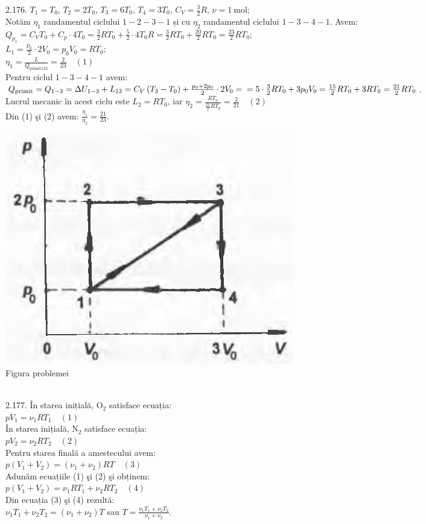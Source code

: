 2.176. $T_{1}=T_{0}$, $T_{2}=2 T_{0}$, $T_{3}=6 T_{0}$, $T_{4}=3 T_{0}$, $C_{V}=\frac{3}{2} R$, $\nu=1 \mathrm{~mol}$;\\ Notăm $\eta_{1}$ randamentul ciclului $1-2-3-1$ și cu $\eta_{2}$ randamentul ciclului $1-3-4-1$. Avem:\\ $Q_{p_{1}}=C_{V} T_{0}+C_{p} \cdot 4 T_{0}=\frac{3}{2} R T_{0}+\frac{5}{2} \cdot 4 T_{0} R=\frac{3}{2} R T_{0}+\frac{20}{2} R T_{0}=\frac{23}{2} R T_{0}$;\\ $L_{1}=\frac{p_{0}}{2} \cdot 2 V_{0}=p_{0} V_{0}=R T_{0}$;\\ $\eta_{1}=\frac{L}{Q_{\text {primit} 123}}=\frac{2}{23} \quad (1)$\\ Pentru ciclul $1-3-4-1$ avem:\\ $Q_{\text {primit}}=Q_{1-3}=\Delta U_{1-3}+L_{13}=C_{V}\left(T_{3}-T_{0}\right)+\frac{p_{0}+2 p_{0}}{2} \cdot 2 V_{0}= \\ =5 \cdot \frac{3}{2} R T_{0}+3 p_{0} V_{0}=\frac{15}{2} R T_{0}+3 R T_{0}=\frac{21}{2} R T_{0}$.\\ Lucrul mecanic în acest ciclu este $L_{2}=R T_{0}$, iar $\eta_{2}=\frac{R T_{0}}{\frac{21}{2} R T_{0}}=\frac{2}{21} \quad (2)$\\ Din (1) şi (2) avem: $\frac{\eta_{1}}{\eta_{2}}=\frac{21}{23}$.\\ \begin{center} \includegraphics[width=0.4\linewidth]{images/2025_07_01_5b3ff9fa0d508c8e9f17g-307}\\ Figura problemei \end{center}\\

2.177. În starea inițială, $\mathrm{O}_{2}$ satisface ecuația:\\ $p V_{1}=\nu_{1} R T_{1} \quad (1)$\\ În starea inițială, $\mathrm{N}_{2}$ satisface ecuația:\\ $p V_{2}=\nu_{2} R T_{2} \quad (2)$\\ Pentru starea finală a amestecului avem:\\ $p\left(V_{1}+V_{2}\right)=\left(\nu_{1}+\nu_{2}\right) R T \quad (3)$\\ Adunăm ecuațiile (1) şi (2) şi obținem:\\ $p\left(V_{1}+V_{2}\right)=\nu_{1} R T_{1}+\nu_{2} R T_{2} \quad (4)$\\ Din ecuația (3) şi (4) rezultă:\\ $\nu_{1} T_{1}+\nu_{2} T_{2}=\left(\nu_{1}+\nu_{2}\right) T$ sau $T=\frac{\nu_{1} T_{1}+\nu_{2} T_{2}}{\nu_{1}+\nu_{2}}$.\\

